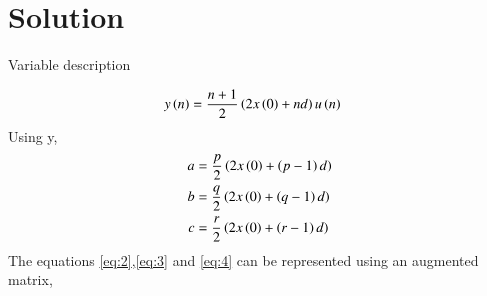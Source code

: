 \documentclass[journal,12pt,twocolumn]{IEEEtran}
\theoremstyle{remark}
\begin{document}
\section*{Solution}
\begin{table}[h]
    \centering
    
    \caption{Variable description}
    \label{tab:11.9.2.11.1}
\end{table}
\begin{align}
    y\left(n\right)&=\dfrac{n+1}{2}\left(2x\left(0\right)+nd\right)u\left(n\right)
\end{align}
Using y,
\begin{align}
    a&=\dfrac{p}{2}\left(2x\left(0\right)+\left(p-1\right)d\right)\label{eq:2}\\
    b&=\dfrac{q}{2}\left(2x\left(0\right)+\left(q-1\right)d\right)\label{eq:3}\\
    c&=\dfrac{r}{2}\left(2x\left(0\right)+\left(r-1\right)d\right)\label{eq:4}
\end{align}
The equations \eqref{eq:2},\eqref{eq:3} and \eqref{eq:4} can be represented using an augmented matrix,
\end{document}
